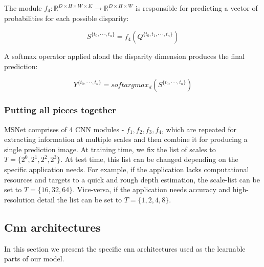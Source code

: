 \documentclass[10pt]{article}
\begin{document}
The module $f_4: \mathbb{R}^{D \times H \times W \times K} \rightarrow \mathbb{R}^{D \times H \times W}$ is responsible for predicting a vector of probabilities for each possible disparity:

$$S^{\{ t_0, \cdot \cdot \cdot, t_n \}} = f_4(Q^{\{t_0, t_1, \cdot \cdot \cdot, t_n\}})$$

A softmax operator applied alond the disparity dimension produces the final prediction:

$$Y^{\{ t_0, \cdot \cdot \cdot, t_n \}} = softargmax_d(S^{\{ t_0, \cdot \cdot \cdot, t_n \}})$$

\subsubsection{Putting all pieces together}

MSNet comprises of 4 CNN modules - $f_1, f_2, f_3, f_4$, which are repeated for extracting information at multiple scales and then combine it for producing a single prediction image. At training time, we fix the list of scales to $T = \{ 2^0, 2^1, 2^2, 2^3 \}$. At test time, this list can be changed depending on the specific application needs. For example, if the application lacks computational resources and targets to a quick and rough depth estimation, the scale-list can be set to $T = \{ 16, 32, 64\}$. Vice-versa, if the application needs accuracy and high-resolution detail the list can be set to $T = \{1, 2, 4, 8 \}$.


\subsection{Cnn architectures}

In this section we present the specific cnn architectures used as the learnable parts of our model. 
\end{document}
